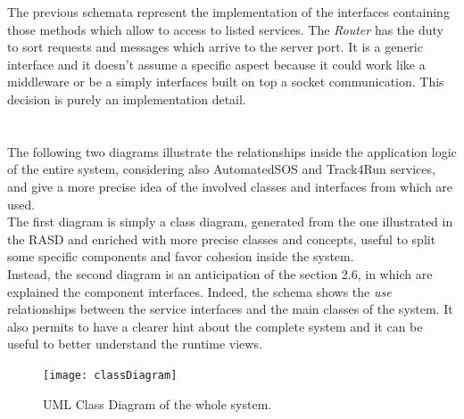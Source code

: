 \documentclass[a4paper]{article}
\begin{document}
\vspace{.5cm}
\noindent The previous schemata represent the implementation of the interfaces containing those methods which allow to access to listed services. The \textit{Router} has the duty to sort requests and messages which arrive to the server port. It is a generic interface and it doesn't assume a specific aspect because it could work like a middleware or be a simply interfaces built on top a socket communication. This decision is purely an implementation detail.\\ \\ \\
The following two diagrams illustrate the relationships inside the application logic of the entire system, considering also AutomatedSOS and Track4Run services, and give a more precise idea of the involved classes and interfaces from which are used.\\
The first diagram is simply a class diagram, generated from the one illustrated in the RASD and enriched with more precise classes and concepts, useful to split some specific components and favor cohesion inside the system.\\
Instead, the second diagram is an anticipation of the section 2.6, in which are explained the component interfaces. Indeed, the schema shows the \textit{use} relationships between the service interfaces and the main classes of the system. It also permits to have a clearer hint about the complete system and it can be useful to better understand the runtime views.  

\begin{figure}
    \centering
    \texttt{[image: classDiagram]}
    \caption{UML Class Diagram of the whole system.}
    \label{fig:my_label}
\end{figure}
\end{document}
